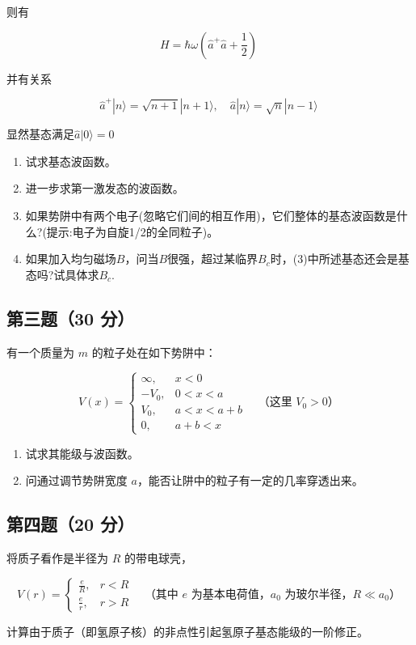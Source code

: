 则有

\[
H = \hbar \omega \left( \hat{a}^+ \hat{a} + \frac{1}{2} \right)~
\]

并有关系

\[
\hat{a}^+ |n\rangle = \sqrt{n+1} |n+1\rangle, \quad
\hat{a} |n\rangle = \sqrt{n} |n-1\rangle~
\]

显然基态满足$\hat{a} |0\rangle = 0$

\begin{enumerate}
    \item 试求基态波函数。
    \item 进一步求第一激发态的波函数。
    \item 如果势阱中有两个电子(忽略它们间的相互作用)，它们整体的基态波函数是什么?(提示:电子为自旋1/2的全同粒子)。
    \item 如果加入均匀磁场$B$，问当$B$很强，超过某临界$B_c$时，(3)中所述基态还会是基态吗?试具体求$B_c$.
\end{enumerate}
\subsection{第三题（30 分）}
有一个质量为 $m$ 的粒子处在如下势阱中：

\[
V(x) =
\begin{cases}
\infty, & x < 0 \\
-V_0, & 0 < x < a \\
V_0, & a < x < a + b \\
0, & a + b < x 
\end{cases}
\quad \text{（这里 } V_0 > 0\text{）}~
\]

\begin{enumerate}
    \item 试求其能级与波函数。
    \item 问通过调节势阱宽度 $a$，能否让阱中的粒子有一定的几率穿透出来。
\end{enumerate}
\subsection{第四题（20 分）}
将质子看作是半径为 $R$ 的带电球壳，

\[
V(r) =
\begin{cases}
\frac{e}{R}, & r < R \\
\frac{e}{r}, & r > R 
\end{cases}
\quad \text{（其中 } e \text{ 为基本电荷值，} a_0 \text{ 为玻尔半径，} R \ll a_0\text{）}~
\]

计算由于质子（即氢原子核）的非点性引起氢原子基态能级的一阶修正。
